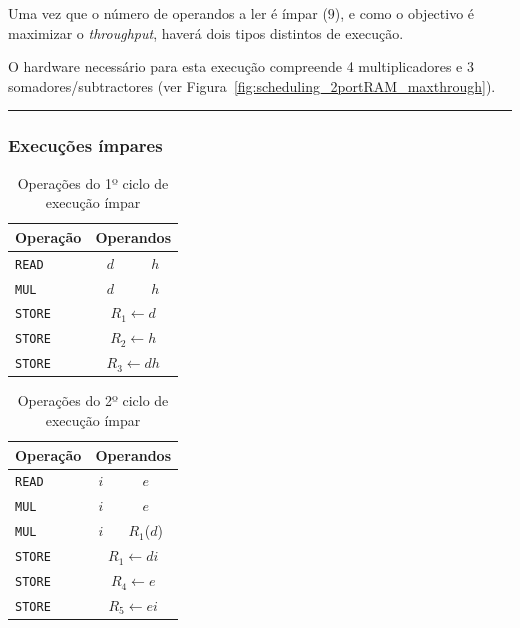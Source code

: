Uma vez que o número de operandos a ler é ímpar ($9$), e como o objectivo é maximizar o \emph{throughput}, haverá dois tipos distintos de execução.

O hardware necessário para esta execução compreende 4 multiplicadores e 3 somadores/subtractores (ver Figura~\ref{fig:scheduling_2portRAM_maxthrough}).

\noindent\rule{\linewidth}{0.4pt}

\begin{multicols}{2}

	\subsubsection{Execuções ímpares}

	\begin{table}[H]
		\centering
		\begin{tabular}{l|c|c}
			Operação & \multicolumn{2}{c}{Operandos} \\
			\hline
			\texttt{READ} & $d$ & $h$ \\
			\hline
			\texttt{MUL} & $d$ & $h$ \\
			\hline
			\texttt{STORE} & \multicolumn{2}{c}{$R_1\leftarrow d$} \\
			\texttt{STORE} & \multicolumn{2}{c}{$R_2\leftarrow h$} \\
			\texttt{STORE} & \multicolumn{2}{c}{$R_3\leftarrow dh$} \\
		\end{tabular}
		\caption{Operações do 1º ciclo de execução ímpar}
		\label{tab:odd_1}
	\end{table}

	\begin{table}[H]
		\centering
		\begin{tabular}{l|c|c}
			Operação & \multicolumn{2}{c}{Operandos} \\
			\hline
			\texttt{READ} & $i$ & $e$ \\
			\hline
			\texttt{MUL} & $i$ & $e$ \\
			\texttt{MUL} & $i$ & $R_1$($d$) \\
			\hline
			\texttt{STORE} & \multicolumn{2}{c}{$R_1\leftarrow di$} \\
			\texttt{STORE} & \multicolumn{2}{c}{$R_4\leftarrow e$} \\
			\texttt{STORE} & \multicolumn{2}{c}{$R_5\leftarrow ei$} \\
		\end{tabular}
		\caption{Operações do 2º ciclo de execução ímpar}
		\label{tab:odd_2}
	\end{table}


\end{multicols}
